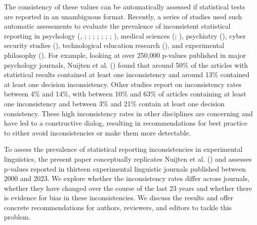 \documentclass[
  doc,
  longtable,
  nolmodern,
  notxfonts,
  notimes,
  colorlinks=true,linkcolor=blue,citecolor=blue,urlcolor=blue]{apa7}
\begin{document}
The consistency of these values can be automatically assessed if
statistical tests are reported in an unambiguous format. Recently, a
series of studies used such automatic assessments to evaluate the
prevalence of inconsistent statistical reporting in psychology
(,
;
;
;
;
;
;
;
), medical
sciences (; ),
psychiatry (), cyber security studies (), technological education research
(), and
experimental philosophy (). For example, looking at over 250,000 p-values published
in major psychology journals, Nuijten et al.
() found that around 50\% of
the articles with statistical results contained at least one
inconsistency and around 13\% contained at least one decision
inconsistency. Other studies report on inconsistency rates between 4\%
and 14\%, with between 10\% and 63\% of articles containing at least one
inconsistency and between 3\% and 21\% contain at least one decision
consistency. These high inconsistency rates in other disciplines are
concerning and have led to a constructive dialog, resulting in
recommendations for best practice to either avoid inconsistencies or
make them more detectable.

To assess the prevalence of statistical reporting inconsistencies in
experimental linguistics, the present paper conceptually replicates
Nuijten et al. () and assesses
p-values reported in thirteen experimental linguistic journals published
between 2000 and 2023. We explore whether the inconsistency rates differ
across journals, whether they have changed over the course of the last
23 years and whether there is evidence for bias in these
inconsistencies. We discuss the results and offer concrete
recommendations for authors, reviewers, and editors to tackle this
problem.
\end{document}
